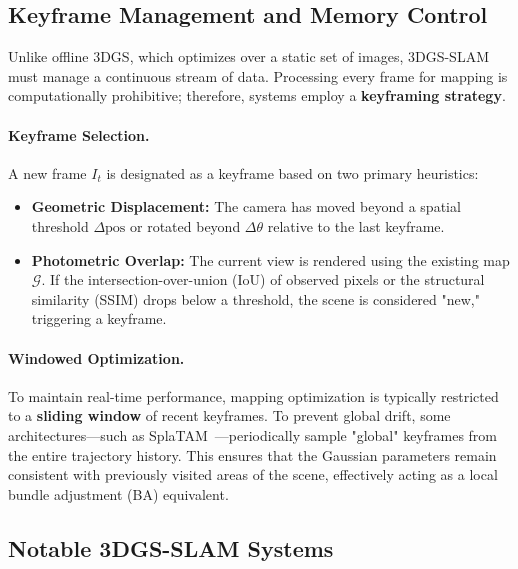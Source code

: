 \subsection{Keyframe Management and Memory Control}
  Unlike offline 3DGS, which optimizes over a static set of images, 
  3DGS-SLAM must manage a continuous stream of data. 
  Processing every frame for mapping is computationally prohibitive; 
  therefore, systems employ a \textbf{keyframing strategy}.
\paragraph{Keyframe Selection.} A new frame $I_t$ is designated as a keyframe based on two primary heuristics:
\begin{itemize}
  \item \textbf{Geometric Displacement:} The camera has moved beyond a spatial threshold $\Delta \text{pos}$ or rotated beyond $\Delta \theta$ relative to the last keyframe.
  \item \textbf{Photometric Overlap:} The current view is rendered using the existing map $\mathcal{G}$. If the intersection-over-union (IoU) of observed pixels or the structural similarity (SSIM) drops below a threshold, the scene is considered "new," triggering a keyframe.\end{itemize}
\paragraph{Windowed Optimization.} To maintain real-time performance, mapping optimization is typically restricted to a \textbf{sliding window} of recent keyframes. To prevent global drift, some architectures—such as SplaTAM~\cite{keetha2024splatam}—periodically sample "global" keyframes from the entire trajectory history. 
This ensures that the Gaussian parameters remain consistent with previously visited areas of the scene, effectively acting as a local bundle adjustment (BA) equivalent.


\subsection{Notable 3DGS-SLAM Systems}

